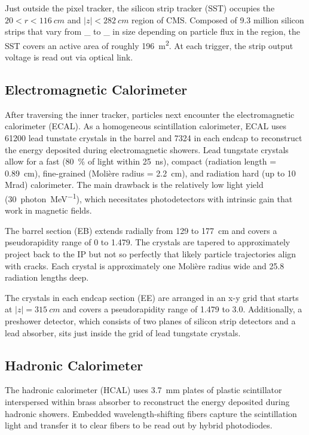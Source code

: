 \documentclass[12pt]{article}
\begin{document}
    Just outside the pixel tracker, the silicon strip tracker (SST) occupies the $\num{20} < r < \SI{116}{cm}$ and $\lvert z \rvert < \SI{282}{cm}$ region of CMS. Composed of \num{9.3} million silicon strips that vary from \_ to \_ in size  depending on particle flux in the region, the SST covers an active area of roughly \SI{196}{m^2}. At each trigger, the strip output voltage is read out via optical link.

\subsection{Electromagnetic Calorimeter}
    After traversing the inner tracker, particles next encounter the electromagnetic calorimeter (ECAL). As a homogeneous scintillation calorimeter, ECAL uses \num{61200} lead tunstate crystals in the barrel and \num{7324} in each endcap to reconstruct the energy deposited during electromagnetic showers. Lead tungstate crystals allow for a fast (\SI{80}{\percent} of light within \SI{25}{ns}), compact (radiation length = \SI{0.89}{cm}), fine-grained (Moli\`ere radius = \SI{2.2}{cm}), and radiation hard (up to 10 Mrad) calorimeter. The main drawback is the relatively low light yield (\SI{30}{photon\per\mega\electronvolt}), which necesitates photodetectors with intrinsic gain that work in magnetic fields.

    The barrel section (EB) extends radially from \num{129} to \SI{177}{cm} and covers a pseudorapidity range of \num{0} to \num{1.479}. The crystals are tapered to approximately project back to the IP but not so perfectly that likely particle trajectories align with cracks. Each crystal is approximately one Moli\`ere radius wide and 25.8 radiation lengths deep.

    The crystals in each endcap section (EE) are arranged in an x-y grid that starts at $\lvert z \rvert = \SI{315}{cm}$ and covers a pseudorapidity range of \num{1.479} to \num{3.0}. Additionally, a preshower detector, which consists of two planes of silicon strip detectors and a lead absorber, sits just inside the grid of lead tungstate crystals. 

\subsection{Hadronic Calorimeter}
    The hadronic calorimeter (HCAL) uses \SI{3.7}{mm} plates of plastic scintillator interspersed within brass absorber to reconstruct the energy deposited during hadronic showers. Embedded wavelength-shifting fibers capture the scintillation light and transfer it to clear fibers to be read out by hybrid photodiodes.
\end{document}
